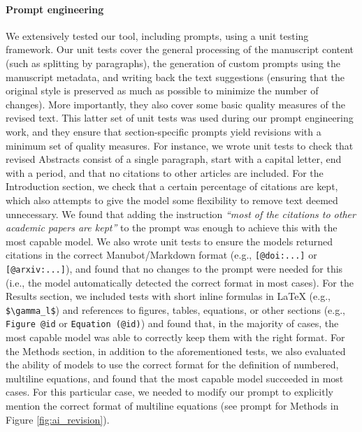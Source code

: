 \documentclass[
]{article}
\begin{document}
\hypertarget{prompt-engineering}{%
\paragraph{Prompt engineering}\label{prompt-engineering}}

We extensively tested our tool, including prompts, using a unit testing framework.
Our unit tests cover the general processing of the manuscript content (such as splitting by paragraphs), the generation of custom prompts using the manuscript metadata, and writing back the text suggestions (ensuring that the original style is preserved as much as possible to minimize the number of changes).
More importantly, they also cover some basic quality measures of the revised text.
This latter set of unit tests was used during our prompt engineering work, and they ensure that section-specific prompts yield revisions with a minimum set of quality measures.
For instance, we wrote unit tests to check that revised Abstracts consist of a single paragraph, start with a capital letter, end with a period, and that no citations to other articles are included.
For the Introduction section, we check that a certain percentage of citations are kept, which also attempts to give the model some flexibility to remove text deemed unnecessary.
We found that adding the instruction \emph{``most of the citations to other academic papers are kept''} to the prompt was enough to achieve this with the most capable model.
We also wrote unit tests to ensure the models returned citations in the correct Manubot/Markdown format (e.g., \texttt{{[}@doi:...{]}} or \texttt{{[}@arxiv:...{]}}), and found that no changes to the prompt were needed for this (i.e., the model automatically detected the correct format in most cases).
For the Results section, we included tests with short inline formulas in LaTeX (e.g., \texttt{\$\textbackslash{}gamma\_l\$}) and references to figures, tables, equations, or other sections (e.g., \texttt{Figure\ @id} or \texttt{Equation\ (@id)}) and found that, in the majority of cases, the most capable model was able to correctly keep them with the right format.
For the Methods section, in addition to the aforementioned tests, we also evaluated the ability of models to use the correct format for the definition of numbered, multiline equations, and found that the most capable model succeeded in most cases.
For this particular case, we needed to modify our prompt to explicitly mention the correct format of multiline equations (see prompt for Methods in Figure \ref{fig:ai_revision}).
\end{document}
